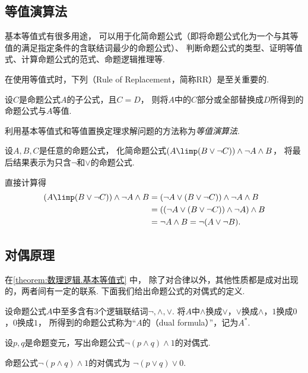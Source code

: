 \subsection{等值演算法}
基本等值式有很多用途，
可以用于化简命题公式（即将命题公式化为一个与其等值的满足指定条件的含联结词最少的命题公式）、
判断命题公式的类型、证明等值式、计算命题公式的范式、命题逻辑推理等.

在使用等值式时，下列（Rule of Replacement，简称RR）是至关重要的.
\begin{theorem}
设\(C\)是命题公式\(A\)的子公式，且\(C = D\)，
则将\(A\)中的\(C\)部分或全部替换成\(D\)所得到的命题公式与\(A\)等值.
\end{theorem}

利用基本等值式和等值置换定理求解问题的方法称为\emph{等值演算法}.

\begin{example}
设\(A,B,C\)是任意的命题公式，
化简命题公式\((A \limp (B \lor \neg C)) \land \neg A \land B\)，
将最后结果表示为只含\(\neg\)和\(\lor\)的命题公式.
\begin{solution}
直接计算得\begin{align*}
	(A \limp (B \lor \neg C)) \land \neg A \land B
	&= (\neg A \lor (B \lor \neg C)) \land \neg A \land B \\
	&= ((\neg A \lor (B \lor \neg C)) \land \neg A) \land B \\
	&= \neg A \land B
	= \neg(A \lor \neg B).
\end{align*}
\end{solution}
\end{example}

\subsection{对偶原理}
在\cref{theorem:数理逻辑.基本等值式} 中，
除了对合律以外，其他性质都是成对出现的，两者间有一定的联系.
下面我们给出命题公式的对偶式的定义.
\begin{definition}
设命题公式\(A\)中至多含有3个逻辑联结词\(\neg,\land,\lor\).
将\(A\)中\(\land\)换成\(\lor\)，\(\lor\)换成\(\land\)，\(1\)换成\(0\)，\(0\)换成\(1\)，
所得到的命题公式称为“\(A\)的（dual formula）”，记为\(A^*\).
\end{definition}

\begin{example}
设\(p,q\)是命题变元，写出命题公式\(\neg(p \land q) \land 1\)的对偶式.
\begin{solution}
命题公式\(\neg(p \land q) \land 1\)的对偶式为
\(\neg(p \lor q) \lor 0\).
\end{solution}
\end{example}

